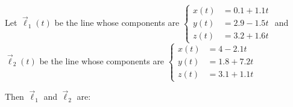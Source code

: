 \documentclass{ximera}
\author{Gregory Hartman \and Matthew Carr}
\begin{document}
\begin{exercise}




Let $\vec{\ell}_{1}(t)$ be the line whose components are $\left\{ \begin{aligned}
x(t) & =0.1+1.1t\\
y(t) & =2.9-1.5t\\
z(t) & =3.2+1.6t
\end{aligned}
\right.$  and $\vec{\ell}_{2}(t)$ be the line whose components are $\left\{ \begin{aligned}
x(t) & =4-2.1t\\
y(t) & =1.8+7.2t\\
z(t) & =3.1+1.1t
\end{aligned}
\right.$

Then $\vec{\ell}_{1}$ and $\vec{\ell}_{2}$ are: 

\begin{multipleChoice}
\end{multipleChoice}


\end{exercise}
\end{document}
